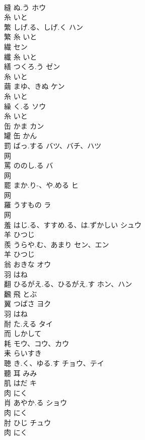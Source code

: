 \documentclass[8pt]{extreport}
\begin{document}
\begin{CJK}{UTF8}{min}
\\	縫	ぬ.う	ホウ	
\\	糸		いと		
\\	繁	しげ.る、しげ.く	ハン	
\\	繁	糸		いと		
\\	繊		セン	
\\	纖	糸		いと		
\\	繕	つくろ.う	ゼン	
\\	糸		いと		
\\	繭	まゆ、きぬ	ケン	
\\	糸		いと		
\\	繰	く.る	ソウ	
\\	糸		いと		
\\	缶	かま	カン	
\\	罐	缶		かん		
\\	罰	ばっ.する	バツ、バチ、ハツ	
\\	网				
\\	罵	ののし.る	バ	
\\	网				
\\	罷	まか.り-、や.める	ヒ	
\\	网				
\\	羅	うすもの	ラ	
\\	网				
\\	羞	はじ.る、すすめ.る、は.ずかしい	シュウ	
\\	羊		ひつじ		
\\	羨	うらや.む、あまり	セン、エン	
\\	羊		ひつじ		
\\	翁	おきな	オウ	
\\	羽		はね		
\\	翻	ひるがえ.る、ひるがえ.す	ホン、ハン	
\\	飜	飛		とぶ		
\\	翼	つばさ	ヨク	
\\	羽		はね		
\\	耐	た.える	タイ	
\\	而		しかして		
\\	耗		モウ、コウ、カウ	
\\	耒		らいすき		
\\	聴	き.く、ゆる.す	チョウ、テイ	
\\	聽	耳		みみ		
\\	肌	はだ	キ	
\\	肉		にく		
\\	肖	あやか.る	ショウ	
\\	肉		にく		
\\	肘	ひじ	チュウ	
\\	肉		にく		

\end{CJK}
\end{document}
